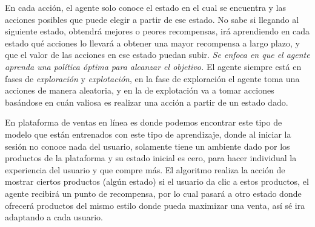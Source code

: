 En cada acción, el agente solo conoce el estado en el cual se encuentra y las acciones posibles que puede elegir a partir de ese estado. No sabe si llegando al siguiente estado, obtendrá mejores o peores recompensas, irá aprendiendo en cada estado qué acciones lo llevará a obtener una mayor recompensa a largo plazo, y que el valor de las acciones en ese estado puedan subir. \emph{Se enfoca en que el agente aprenda una política óptima para alcanzar el objetivo.} El agente siempre está en fases de \emph{exploración} y \emph{explotación}, en la fase de exploración el agente toma una acciones de manera aleatoria, y en la de explotación va a tomar acciones basándose en cuán valiosa es realizar una acción a partir de un estado dado.

En plataforma de ventas en línea es donde podemos encontrar este tipo de modelo que están entrenados con este tipo de aprendizaje, donde al iniciar la sesión no conoce nada del usuario, solamente tiene un ambiente dado por los productos de la plataforma y su estado inicial es cero, para hacer individual la experiencia del usuario y que compre más. El algoritmo realiza la acción de mostrar ciertos productos (algún estado) si el usuario da clic a estos productos, el agente recibirá un punto de recompensa, por lo cual pasará a otro estado donde ofrecerá productos del mismo estilo donde pueda maximizar una venta, así sé ira adaptando a cada usuario.
